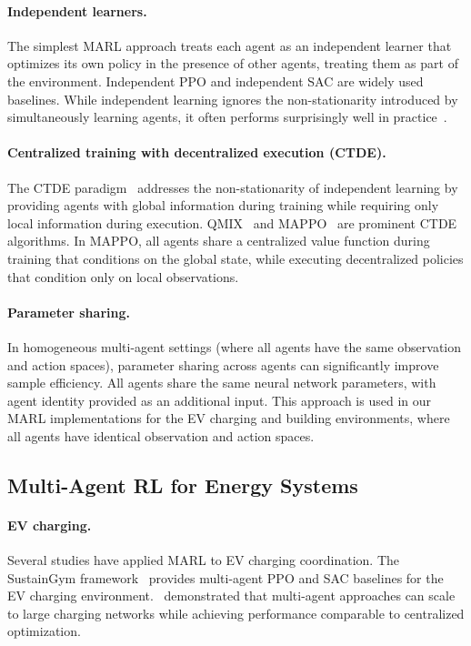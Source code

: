 \paragraph{Independent learners.} The simplest MARL approach treats each agent as an independent learner that optimizes its own policy in the presence of other agents, treating them as part of the environment. Independent PPO and independent SAC are widely used baselines. While independent learning ignores the non-stationarity introduced by simultaneously learning agents, it often performs surprisingly well in practice~\citep{papoudakis2021benchmarking_marl}.

\paragraph{Centralized training with decentralized execution (CTDE).} The CTDE paradigm~\citep{lowe2017maddpg} addresses the non-stationarity of independent learning by providing agents with global information during training while requiring only local information during execution. QMIX~\citep{rashid2020qmix} and MAPPO~\citep{yu2022mappo} are prominent CTDE algorithms. In MAPPO, all agents share a centralized value function during training that conditions on the global state, while executing decentralized policies that condition only on local observations.

\paragraph{Parameter sharing.} In homogeneous multi-agent settings (where all agents have the same observation and action spaces), parameter sharing across agents can significantly improve sample efficiency. All agents share the same neural network parameters, with agent identity provided as an additional input. This approach is used in our MARL implementations for the EV charging and building environments, where all agents have identical observation and action spaces.

\subsection{Multi-Agent RL for Energy Systems}

\paragraph{EV charging.} Several studies have applied MARL to EV charging coordination. The SustainGym framework~\citep{yeh2023sustaingym} provides multi-agent PPO and SAC baselines for the EV charging environment.~\citet{qiu2023marl_ev} demonstrated that multi-agent approaches can scale to large charging networks while achieving performance comparable to centralized optimization.

